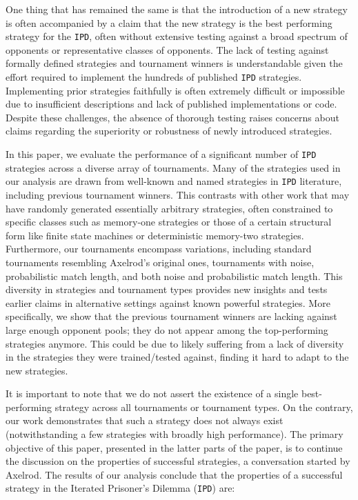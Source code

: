 \documentclass{article}
\def\IPD{\texttt{IPD}}
\begin{document}
One thing that has remained the same is that the introduction of a new strategy
is often accompanied by a claim that the new strategy is the best performing
strategy for the \IPD, often without extensive testing against a broad spectrum
of opponents or representative classes of opponents. The lack of testing against
formally defined strategies and tournament winners is understandable given the
effort required to implement the hundreds of published \IPD{} strategies.
Implementing prior strategies faithfully is often extremely difficult or
impossible due to insufficient descriptions and lack of published
implementations or code. Despite these challenges, the absence of thorough
testing raises concerns about claims regarding the superiority or robustness of
newly introduced strategies.

In this paper, we evaluate the performance of a significant number of \IPD{}
strategies across a diverse array of tournaments. Many of the strategies used in
our analysis are drawn from well-known and named strategies in \IPD{}
literature, including previous tournament winners. This contrasts with other
work that may have randomly generated essentially arbitrary strategies, often
constrained to specific classes such as memory-one strategies or those of a
certain structural form like finite state machines or deterministic memory-two
strategies. Furthermore, our tournaments encompass variations, including standard
tournaments resembling Axelrod's original ones, tournaments with noise,
probabilistic match length, and both noise and probabilistic match length. This
diversity in strategies and tournament types provides new insights and tests
earlier claims in alternative settings against known powerful strategies.
More specifically, we show that the previous tournament
winners are lacking against large enough opponent pools; they do not appear
among the top-performing strategies anymore. This could be due to likely
suffering from a lack of diversity in the strategies they were trained/tested
against, finding it hard to adapt to the new strategies.

It is important to note that we do not assert the existence of a single
best-performing strategy across all tournaments or tournament types. On the
contrary, our work demonstrates that such a strategy does not always exist
(notwithstanding a few strategies with broadly high performance). The primary
objective of this paper, presented in the latter parts of the paper, is to
continue the discussion on the properties of successful strategies, a
conversation started by Axelrod. 
The results of our analysis conclude that the properties of a successful
strategy in the Iterated Prisoner's Dilemma (\IPD{}) are:
\end{document}
